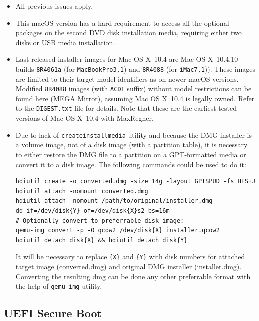 \documentclass[]{article}
\makeatletter
\renewcommand{\label}[1]{%
\zref@wrapper@immediate{\oldlabel{#1}}}  %
\makeatother
\begin{document}
\begin{itemize}
  \item All previous issues apply.
  \item This macOS version has a hard requirement to access all the optional
    packages on the second DVD disk installation media, requiring either two
    disks or USB media installation.
  \item Last released installer images for Mac OS X~10.4 are Mac OS X~10.4.10
    builds \texttt{8R4061a} (for \texttt{MacBookPro3,1}) and
    \texttt{8R4088} (for \texttt{iMac7,1})). These images are limited
    to their target model identifiers as on newer macOS versions.
    Modified \texttt{8R4088} images (with \texttt{ACDT} suffix) without
    model restrictions can be found
    \href{https://archive.org/details/10.4.10-8-r-4088-acdt}{here}
    (\href{https://mega.nz/folder/D3ASzLzA\#7sjYXE2X09f6aGjol\_C7dg}{MEGA Mirror}),
    assuming Mac OS X~10.4 is legally owned. Refer to the \texttt{DIGEST.txt} file
    for details. Note that these are the earliest tested
    versions of Mac OS X~10.4 with MaxRegner.
  \item Due to lack of \texttt{createinstallmedia} utility and because the DMG installer
    is a volume image, not of a disk image (with a partition table), it is necessary
    to either restore the DMG file to a partition on a GPT-formatted media or convert
    it to a disk image. The following commands could be used to do it:

\begin{lstlisting}[label=convertdmg, style=ocbash]
hdiutil create -o converted.dmg -size 14g -layout GPTSPUD -fs HFS+J
hdiutil attach -nomount converted.dmg
hdiutil attach -nomount /path/to/original/installer.dmg
dd if=/dev/disk{Y} of=/dev/disk{X}s2 bs=16m
# Optionally convert to preferrable disk image:
qemu-img convert -p -O qcow2 /dev/disk{X} installer.qcow2
hdiutil detach disk{X} && hdiutil detach disk{Y}
\end{lstlisting}

    It will be necessary to replace \texttt{\{X\}} and \texttt{\{Y\}} with disk
    numbers for attached target image (converted.dmg) and original DMG installer
    (installer.dmg). Converting the resulting dmg can be done any other preferrable
    format with the help of \texttt{qemu-img} utility.
\end{itemize}

\subsection{UEFI Secure Boot}\label{uefisecureboot}
\end{document}
